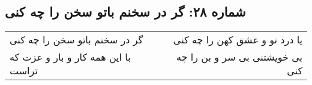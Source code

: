 \begin{center}
\section*{شماره ۲۸: گر در سخنم باتو سخن را چه کنی}
\label{sec:028}
\begin{longtable}{l p{0.5cm} r}
گر در سخنم باتو سخن را چه کنی
&&
یا درد نو و عشق کهن را چه کنی
\\
با این همه کار و بار و عزت که تراست
&&
بی خویشتنی بی سر و بن را چه کنی
\\
\end{longtable}
\end{center}

